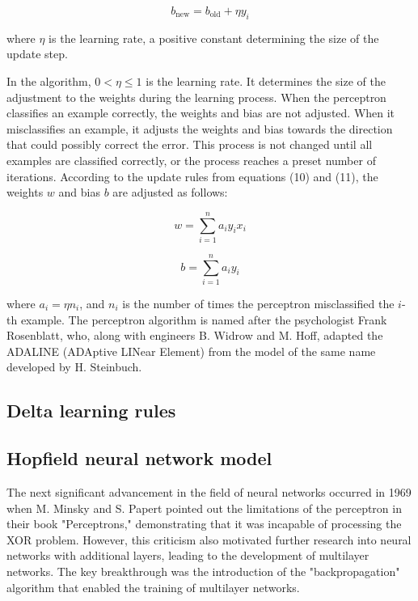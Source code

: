 \documentclass[paper=a4, fontsize=11pt]{scrartcl} %
\numberwithin{equation}{section} %
\numberwithin{figure}{section} %
\numberwithin{table}{section} %
\begin{document}
\begin{equation}
b_{\text{new}} = b_{\text{old}} + \eta y_i
\end{equation}

where \( \eta \) is the learning rate, a positive constant determining the size of the update step.


In the algorithm, \( 0 < \eta \leq 1 \) is the learning rate. It determines the size of the adjustment to the weights during the learning process. When the perceptron classifies an example correctly, the weights and bias are not adjusted. When it misclassifies an example, it adjusts the weights and bias towards the direction that could possibly correct the error. This process is not changed until all examples are classified correctly, or the process reaches a preset number of iterations. According to the update rules from equations (10) and (11), the weights \( w \) and bias \( b \) are adjusted as follows:

\begin{equation}
w = \sum_{i=1}^{n} a_i y_i x_i
\end{equation}

\begin{equation}
b = \sum_{i=1}^{n} a_i y_i
\end{equation}

where \( a_i = \eta n_i \), and \( n_i \) is the number of times the perceptron misclassified the \( i \)-th example. The perceptron algorithm is named after the psychologist Frank Rosenblatt, who, along with engineers B. Widrow and M. Hoff, adapted the ADALINE (ADAptive LINear Element) from the model of the same name developed by H. Steinbuch.

\subsection{Delta learning rules}

\subsection{Hopfield neural network model}
The next significant advancement in the field of neural networks occurred in 1969 when M. Minsky and S. Papert pointed out the limitations of the perceptron in their book "Perceptrons," demonstrating that it was incapable of processing the XOR problem. However, this criticism also motivated further research into neural networks with additional layers, leading to the development of multilayer networks. The key breakthrough was the introduction of the "backpropagation" algorithm that enabled the training of multilayer networks.
\end{document}

